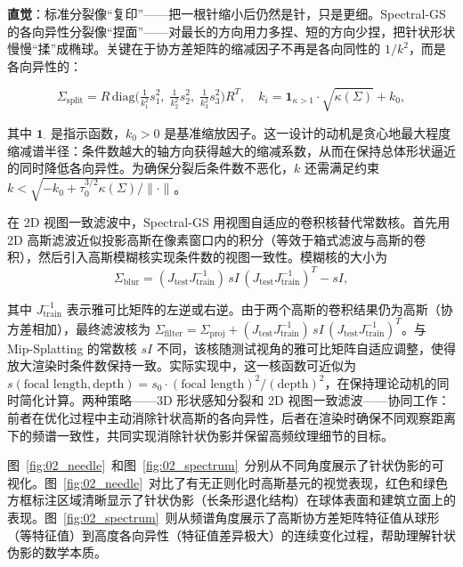 \textbf{直觉}：标准分裂像``复印''——把一根针缩小后仍然是针，只是更细。Spectral-GS 的各向异性分裂像``捏面''——对最长的方向用力多捏、短的方向少捏，把针状形状慢慢``揉''成椭球。关键在于协方差矩阵的缩减因子不再是各向同性的 $1/k^2$，而是各向异性的：

\begin{equation}
\Sigma_{\mathrm{split}} = R\,\mathrm{diag}\!\bigl(\tfrac{1}{k_1^2}s_1^2,\;\tfrac{1}{k_2^2}s_2^2,\;\tfrac{1}{k_3^2}s_3^2\bigr)R^T, \quad k_i = \mathbf{1}_{\kappa > 1}\!\cdot\sqrt{\kappa(\Sigma)} + k_0,
\label{eq:02_spectral_split}
\end{equation}

其中 $\mathbf{1}_{\cdot}$ 是指示函数，$k_0 > 0$ 是基准缩放因子。这一设计的动机是贪心地最大程度缩减谱半径：条件数越大的轴方向获得越大的缩减系数，从而在保持总体形状逼近的同时降低各向异性。为确保分裂后条件数不恶化，$k$ 还需满足约束 $k < \sqrt{-k_0 + \tau_0^{3/2}\kappa(\Sigma)/\|\cdot\|}$。

在 2D 视图一致滤波中，Spectral-GS 用视图自适应的卷积核替代常数核。首先用 2D 高斯滤波近似投影高斯在像素窗口内的积分（等效于箱式滤波与高斯的卷积），然后引入高斯模糊核实现条件数的视图一致性。模糊核的大小为
\begin{equation}
\Sigma_{\mathrm{blur}} = (J_{\mathrm{test}}J_{\mathrm{train}}^{-1})\,sI\,(J_{\mathrm{test}}J_{\mathrm{train}}^{-1})^T - sI,
\label{eq:02_view_consistent}
\end{equation}

其中 $J_{\mathrm{train}}^{-1}$ 表示雅可比矩阵的左逆或右逆。由于两个高斯的卷积结果仍为高斯（协方差相加），最终滤波核为 $\Sigma_{\mathrm{filter}} = \Sigma_{\mathrm{proj}} + (J_{\mathrm{test}}J_{\mathrm{train}}^{-1})\,sI\,(J_{\mathrm{test}}J_{\mathrm{train}}^{-1})^T$。与 Mip-Splatting 的常数核 $sI$ 不同，该核随测试视角的雅可比矩阵自适应调整，使得放大渲染时条件数保持一致。实际实现中，这一核函数可近似为 $s(\text{focal length}, \text{depth}) = s_0 \cdot (\text{focal length})^2/(\text{depth})^2$，在保持理论动机的同时简化计算。两种策略——3D 形状感知分裂和 2D 视图一致滤波——协同工作：前者在优化过程中主动消除针状高斯的各向异性，后者在渲染时确保不同观察距离下的频谱一致性，共同实现消除针状伪影并保留高频纹理细节的目标。

图~\ref{fig:02_needle}~和图~\ref{fig:02_spectrum}~分别从不同角度展示了针状伪影的可视化。图~\ref{fig:02_needle}~对比了有无正则化时高斯基元的视觉表现，红色和绿色方框标注区域清晰显示了针状伪影（长条形退化结构）在球体表面和建筑立面上的表现。图~\ref{fig:02_spectrum}~则从频谱角度展示了高斯协方差矩阵特征值从球形（等特征值）到高度各向异性（特征值差异极大）的连续变化过程，帮助理解针状伪影的数学本质。

